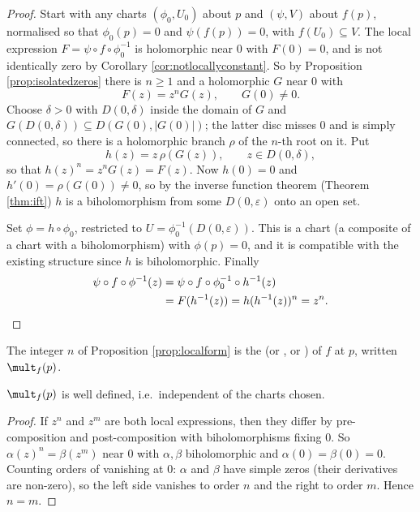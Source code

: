 \begin{proof}
	Start with any charts $(\phi_0, U_0)$ about $p$ and $(\psi, V)$ about $f(p)$,
	normalised so that $\phi_0(p) = 0$ and $\psi(f(p)) = 0$, with $f(U_0) \subseteq V$. The
	local expression $F = \psi \circ f \circ \phi_0^{-1}$ is holomorphic near $0$ with
	$F(0) = 0$, and is not identically zero by Corollary \ref{cor:notlocallyconstant}. So by
	Proposition \ref{prop:isolatedzeros} there is $n \geq 1$ and a holomorphic $G$ near $0$
	with
	$$
	F(z) = z^n G(z), \qquad G(0) \neq 0.
	$$
	Choose $\delta > 0$ with $D(0,\delta)$ inside the domain of $G$ and
	$G(D(0,\delta)) \subseteq D(G(0), |G(0)|)$; the latter disc misses $0$ and is
	simply connected, so there is a holomorphic branch $\rho$ of the $n$-th root on it.
	Put
	$$
	h(z) = z\,\rho(G(z)), \qquad z \in D(0,\delta),
	$$
	so that $h(z)^n = z^n G(z) = F(z)$. Now $h(0) = 0$ and
	$h'(0) = \rho(G(0)) \neq 0$, so by the inverse function theorem (Theorem \ref{thm:ift})
	$h$ is a biholomorphism from some $D(0,\varepsilon)$ onto an open set.

	Set $\phi = h \circ \phi_0$, restricted to $U = \phi_0^{-1}(D(0,\varepsilon))$. This is
	a chart (a composite of a chart with a biholomorphism) with $\phi(p) = 0$, and it is
	compatible with the existing structure since $h$ is biholomorphic. Finally
	\begin{align*}
	\psi \circ f \circ \phi^{-1}(z) &= \psi \circ f \circ \phi_0^{-1}\circ h^{-1}(z)\\
	&= F(h^{-1}(z)) = h(h^{-1}(z))^n = z^n. \qedhere
	\end{align*}
\end{proof}

\begin{definition}[Multiplicity]
	The integer $n$ of Proposition \ref{prop:localform} is the  (or
	, or ) of $f$ at $p$, written $\mult_f(p)$.
\end{definition}

\begin{lemma}
	$\mult_f(p)$ is well defined, i.e.\ independent of the charts chosen.
\end{lemma}

\begin{proof}
	If $z^n$ and $z^m$ are both local expressions, then they differ by pre-composition
	and post-composition with biholomorphisms fixing $0$. So $\alpha(z)^n = \beta(z^m)$ near
	$0$ with $\alpha,\beta$ biholomorphic and $\alpha(0)=\beta(0)=0$. Counting orders of
	vanishing at $0$: $\alpha$ and $\beta$ have simple zeros (their derivatives are
	non-zero), so the left side vanishes to order $n$ and the right to order $m$. Hence
	$n=m$.
\end{proof}

